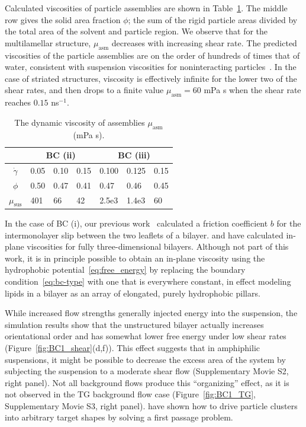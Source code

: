 \documentclass[prb,preprint,showpacs,preprintnumbers,amsmath,amssymb,longbibliography]{revtex4-1}
\begin{document}
Calculated viscosities of particle assemblies are shown in
Table~\ref{tbl:bcii_visc}. The middle row gives the solid area fraction
$\phi$; the sum of the rigid particle areas divided by the total area of
the solvent and particle region. We observe that for the multilamellar
structure, $\mu_{\text{asm}}$ decreases with increasing shear rate. The
predicted viscosities of the particle assemblies are on the order of
hundreds of times that of water, consistent with suspension viscosities
for noninteracting particles~\cite{KONIJN201461}. In the case of
striated structures, viscosity is effectively infinite for the lower two
of the shear rates, and then drops to a finite value $\mu_{\text{asm}} =
60$ mPa s when the shear rate reaches $0.15$ ns$^{-1}$.
\begin{table}
  \caption{\label{tbl:bcii_visc} The dynamic viscosity of assemblies
  $\mu_{\text{asm}}$ (mPa s).}
\centering
\begin{tabularx}{0.7\textwidth}{c|X|X|X||X|X|X}
&\multicolumn{3}{c||}{BC (ii)} & \multicolumn{3}{c}{BC (iii)}\\
\hline
  $\dot \gamma$ & 0.05 & 0.10 \quad & 0.15 & 0.100 & 0.125 & 0.15\\
  \hline
  $\phi$ & 0.50 & 0.47 & 0.41 & 0.47 & 0.46 & 0.45 \\
  \hline
  $\mu_{\text{sus}} $ & 401 & 66 & 42 & 2.5e3 & 1.4e3 & 60\\
\hline
\end{tabularx}
\end{table}

In the case of BC (i), our previous work~\cite{Fu2022_JFM} calculated a
friction coefficient $b$ for the intermonolayer slip between the two
leaflets of a bilayer. \citet{denOtter2007,Zgorski2019} and
\citet{doi:10.1073/pnas.2100156118} have calculated in-plane viscosities
for fully three-dimensional bilayers. Although not part of this work, it
is in principle possible to obtain an in-plane viscosity using the
hydrophobic potential~\eqref{eq:free_energy} by replacing the boundary
condition~\eqref{eq:bc-type} with one that is everywhere constant, in
effect modeling lipids in a bilayer as an array of elongated, purely
hydrophobic pillars. 

While increased flow strengths generally injected energy into the
suspension, the simulation results show that the unstructured bilayer
actually increases orientational order and has somewhat lower free
energy under low shear rates (Figure~\ref{fig:BC1_shear}(d,f)). This
effect suggests that in amphiphilic suspensions, it might be possible to
decrease the excess area of the system by subjecting the suspension to a
moderate shear flow (Supplementary Movie S2, right panel).
Not all background flows produce this
``organizing'' effect, as it is not observed in the TG background flow
case (Figure~\ref{fig:BC1_TG}, Supplementary Movie S3, right panel).
\citet{PhysRevLett.128.256102} have
shown how to drive particle clusters into arbitrary target shapes by
solving a first passage problem.
\end{document}
